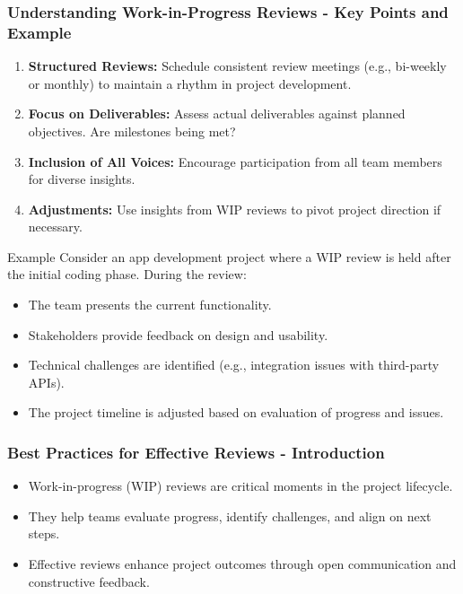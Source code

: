 \documentclass[aspectratio=169]{beamer}
\begin{document}
\begin{frame}[fragile]
    \frametitle{Understanding Work-in-Progress Reviews - Key Points and Example}
    
    \begin{enumerate}
        \item \textbf{Structured Reviews:} Schedule consistent review meetings (e.g., bi-weekly or monthly) to maintain a rhythm in project development.
        \item \textbf{Focus on Deliverables:} Assess actual deliverables against planned objectives. Are milestones being met?
        \item \textbf{Inclusion of All Voices:} Encourage participation from all team members for diverse insights.
        \item \textbf{Adjustments:} Use insights from WIP reviews to pivot project direction if necessary.
    \end{enumerate}
    
    \begin{block}{Example}
        Consider an app development project where a WIP review is held after the initial coding phase. 
        During the review:
        \begin{itemize}
            \item The team presents the current functionality.
            \item Stakeholders provide feedback on design and usability.
            \item Technical challenges are identified (e.g., integration issues with third-party APIs).
            \item The project timeline is adjusted based on evaluation of progress and issues.
        \end{itemize}
    \end{block}
\end{frame}

\begin{frame}[fragile]
    \frametitle{Best Practices for Effective Reviews - Introduction}
    \begin{itemize}
        \item Work-in-progress (WIP) reviews are critical moments in the project lifecycle.
        \item They help teams evaluate progress, identify challenges, and align on next steps.
        \item Effective reviews enhance project outcomes through open communication and constructive feedback.
    \end{itemize}
\end{frame}
\end{document}
